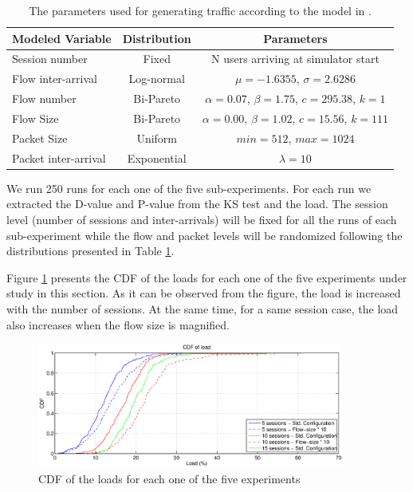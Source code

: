 \begin{table}[h!]
	\begin{center}
		\begin{tabular}{ l | c | c }
			Modeled Variable & Distribution & Parameters \\ \hline
			Session number	& Fixed & N users arriving at simulator start \\
			Flow inter-arrival & Log-normal & $\mu = -1.6355$, $\sigma = 2.6286$ \\
			Flow number & Bi-Pareto & $\alpha = 0.07$, $\beta = 1.75$, $c = 295.38$, $k = 1$ \\
			Flow Size & Bi-Pareto & $\alpha = 0.00$, $\beta = 1.02$, $c = 15.56$, $k = 111$ \\
			Packet Size & Uniform & $min = 512$, $max = 1024$ \\
			Packet inter-arrival & Exponential & $\lambda = 10$ \\
		\end{tabular}
		\caption{The parameters used for generating traffic according to the model in \cite{Campus-WLAN}.}
		\label{tab:sim_traffic_model}
	\end{center}
\end{table}

We run 250 runs for each one of the five sub-experiments. For each run we extracted the D-value and P-value from the KS test and the load. The session level (number of sessions and inter-arrivals) will be fixed for all the runs of each sub-experiment while the flow and packet levels will be randomized following the distributions presented in Table \ref{tab:sim_traffic_model}.

Figure \ref{fig:insession_load_cdf} presents the \acs{CDF} of the loads for each one of the five experiments under study in this section. As it can be observed from the figure, the load is increased with the number of sessions. At the same time, for a same session case, the load also increases when the flow size is magnified. 

\begin{figure}[h!]
	\centering
	\includegraphics[width=0.9\textwidth]{images/results/GlobalView/flows/cdf_load}
	\caption{CDF of the loads for each one of the five experiments}
	\label{fig:insession_load_cdf}
\end{figure}

